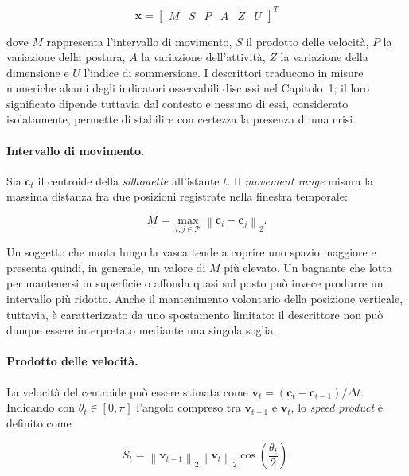 \begin{equation}
    \mathbf{x}
    =
    \begin{bmatrix}
        M & S & P & A & Z & U
    \end{bmatrix}^{T}
\end{equation}

dove $M$ rappresenta l'intervallo di movimento, $S$ il prodotto delle velocità, $P$ la variazione della postura, $A$ la variazione dell'attività, $Z$ la variazione della dimensione e $U$ l'indice di sommersione. I descrittori traducono in misure numeriche alcuni degli indicatori osservabili discussi nel Capitolo~1; il loro significato dipende tuttavia dal contesto e nessuno di essi, considerato isolatamente, permette di stabilire con certezza la presenza di una crisi.

\paragraph{Intervallo di movimento.}
Sia $\mathbf{c}_t$ il centroide della \textit{silhouette} all'istante $t$. Il \textit{movement range} misura la massima distanza fra due posizioni registrate nella finestra temporale:

\begin{equation}
    M
    =
    \max_{i,j\in\mathcal{T}}
    \left\lVert
        \mathbf{c}_i-\mathbf{c}_j
    \right\rVert_2.
\end{equation}

Un soggetto che nuota lungo la vasca tende a coprire uno spazio maggiore e presenta quindi, in generale, un valore di $M$ più elevato. Un bagnante che lotta per mantenersi in superficie o affonda quasi sul posto può invece produrre un intervallo più ridotto. Anche il mantenimento volontario della posizione verticale, tuttavia, è caratterizzato da uno spostamento limitato: il descrittore non può dunque essere interpretato mediante una singola soglia.

\paragraph{Prodotto delle velocità.}
La velocità del centroide può essere stimata come $\mathbf{v}_t=(\mathbf{c}_t-\mathbf{c}_{t-1})/\Delta t$. Indicando con $\theta_t\in[0,\pi]$ l'angolo compreso tra $\mathbf{v}_{t-1}$ e $\mathbf{v}_t$, lo \textit{speed product} è definito come

\begin{equation}
    S_t
    =
    \left\lVert\mathbf{v}_{t-1}\right\rVert_2
    \left\lVert\mathbf{v}_t\right\rVert_2
    \cos\left(\frac{\theta_t}{2}\right).
\end{equation}

